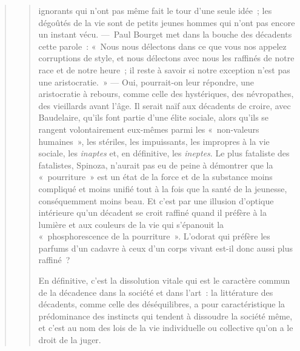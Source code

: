 \documentclass[french,twoside]{book} %
\begin{document}
\begin{verse}
\begin{verse}
ignorants qui n’ont pas même fait le tour d’une seule idée ; les dégoûtés de la vie sont de petits jeunes hommes qui n’ont pas encore un instant vécu. — Paul Bourget met dans la bouche des décadents cette parole : « Nous nous délectons dans ce que vous nos appelez corruptions de style, et nous délectons avec nous les raffinés de notre race et de notre heure ; il reste à savoir si notre exception n’est pas une aristocratie. » — Oui, pourrait-on leur répondre, une aristocratie à rebours, comme celle des hystériques, des névropathes, des vieillards avant l’âge. Il serait naïf aux décadents de croire, avec Baudelaire, qu’ils font partie d’une élite sociale, alors qu’ils se rangent volontairement eux-mêmes parmi les « non-valeurs humaines », les stériles, les impuissants, les impropres à la vie sociale, les \emph{inaptes} et, en définitive, les \emph{ineptes}. Le plus fataliste des fatalistes, Spinoza, n’aurait pas eu de peine à démontrer que la « pourriture » est un état de la force et de la substance moins compliqué et moins unifié tout à la fois que la santé de la jeunesse, conséquemment moins beau. Et c’est par une illusion d’optique intérieure qu’un décadent se croit raffiné quand il préfère à la lumière et aux couleurs de la vie qui s’épanouit la « phosphorescence de la pourriture ». L’odorat qui préfère les parfums d’un cadavre à ceux d’un corps vivant est-il donc aussi plus raffiné ?\par
En définitive, c’est la dissolution vitale qui est le caractère commun de la décadence dans la société et dans l’art : la littérature des décadents, comme celle des déséquilibres, a pour caractéristique la prédominance des instincts qui tendent à dissoudre la société même, et c’est au nom des lois de la vie individuelle ou collective qu’on a le droit de la juger.

\end{verse}
\end{verse}
\end{document}
